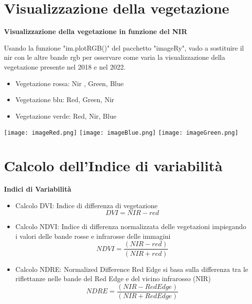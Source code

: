 \documentclass{beamer}
\begin{document}
\section{Visualizzazione della vegetazione}

\begin{frame}
{\Large\textbf{Visualizzazione della vegetazione in funzione del NIR}}

Usando la funzione "im.plotRGB()" del pacchetto "imageRy", vado a sostituire il nir con le altre bande rgb per osservare come varia la visualizzazione della vegetazione presente nel 2018 e nel 2022.
  \begin{itemize}
     \item Vegetazione rossa: Nir , Green, Blue 
     \item Vegetazione blu: Red, Green, Nir
     \item Vegetazione verde: Red, Nir, Blue
  \end{itemize}
    \centering
    \texttt{[image: imageRed.png]}
    \texttt{[image: imageBlue.png]}
    \texttt{[image: imageGreen.png]}
\end{frame}

\section{Calcolo dell'Indice di variabilità}

\begin{frame}
{\Large\textbf{Indici di Variabilità}}
\parbox{\linewidth}{
  \begin{itemize}
    \item  Calcolo DVI: Indice di differenza di vegetazione
    \begin{equation}
        DVI = NIR-red 
    \end{equation}
    \item Calcolo NDVI: Indice di differenza normalizzata delle vegetazioni impiegando i valori delle bande rosse e infrarosse delle immagini
    \begin{equation}
        NDVI = \frac{(NIR-red)}{(NIR+red)}
    \end{equation}
    \item Calcolo NDRE: Normalized Difference Red Edge si basa sulla differenza tra le riflettanze nelle bande del Red Edge e del vicino infrarosso (NIR)
    \begin{equation}
        NDRE = \frac{(NIR-Red Edge)}{(NIR+Red Edge)}
    \end{equation} 
  \end{itemize} 
}
\end{frame}
\end{document}
